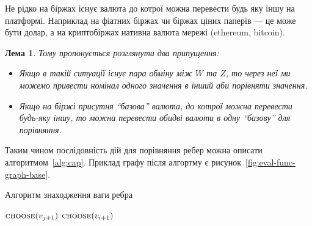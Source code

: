 \documentclass[14pt]{extarticle}
\newtheorem{lemma}{Лема}
\begin{document}
Не рідко на біржах існує валюта до котрої можна перевести будь яку іншу на
платформі. Наприклад на фіатних біржах чи біржах ціних паперів --- це може бути
долар, а на криптобіржах нативна валюта мережі (ethereum, bitcoin).

\begin{lemma}
	Тому пропонується розглянути два припущення:

	\begin{itemize}
		\item Якщо в такій ситуації існує пара обміну між $W$ та $Z$, то через неї
		      ми можемо привести номінал одного значення в інший аби порівняти
		      значення.
		\item Якщо на біржі присутня ``базова'' валюта, до котрої можна перевести
		      будь-яку іншу, то можна перевести обидві валюти в одну ``базову'' для
		      порівняння.
	\end{itemize}
\end{lemma}

Таким чином послідовність дій для порівняння ребер можна описати
алгоритмом~\ref{alg:cap}. Приклад графу після алгортму є
рисунок~\ref{fig:eval-func-graph-base}.

\begin{algorithm}
\caption{Алгоритм знаходження ваги ребра}\label{alg:cap}
\begin{algorithmic}
 
\EndFunction{}
 
\EndFunction{}
 
 
 
 
 
  \EndIf{}
	$\Call{choose}{v_{j+1}}$
  \Else{}
	$\Call{choose}{v_{i+1}}$
  \EndIf{}
\end{algorithmic}
\end{algorithm}
\end{document}

